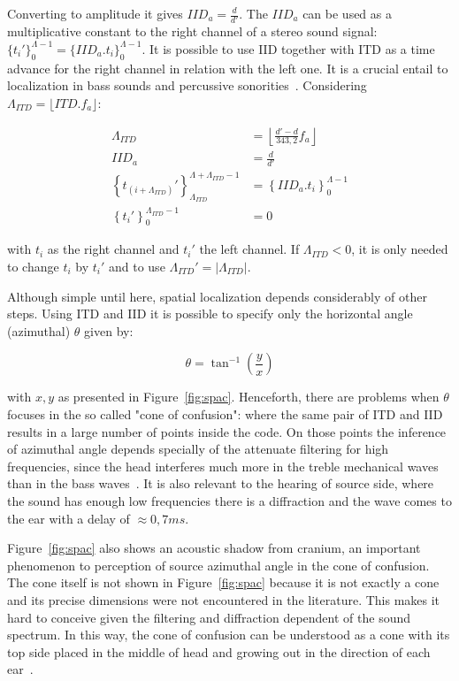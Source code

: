 \documentclass[
 aip,
 jmp,
 amsmath,amssymb,
 reprint,
]{revtex4-1}
\begin{document}
Converting to amplitude it gives $IID_a=\frac{d}{d'}$. The $IID_a$ can be used as a multiplicative constant to the right channel of a stereo sound signal: $\{t_i'\}_0^{\Lambda -1}=\{IID_a . t_i\}_0^{\Lambda -1}$. It is possible to use IID together with ITD as a time advance for the right channel in relation with the left one. It is a crucial entail to localization in bass sounds and percussive sonorities~\cite{Heeger}. 
Considering $\Lambda_{ITD}=\lfloor ITD . f_a \rfloor$:

\begin{equation}\label{eq:locImpl}
\begin{split}
\Lambda_{ITD} & = \left \lfloor \frac{d'-d}{343,2}  f_a \right \rfloor \\
IID_a & = \frac{d}{d'} \\
\left\{t_{(i+\Lambda_{ITD})}'\right\}_{\Lambda_{ITD}}^{\Lambda+\Lambda_{ITD}-1} & =\left\{IID_a . t_i\right\}_0^{\Lambda-1} \\
\left\{t_i'\right\}_0^{\Lambda_{ITD}-1} & = 0
\end{split}
\end{equation}

\noindent with $t_i$ as the right channel and $t_i'$ the left channel. If $\Lambda_{ITD} < 0 $, it is only needed to change $t_i$ by $t_i'$ and to use $\Lambda_{ITD}'= | \Lambda_{ITD} | $.

Although simple until here, spatial localization depends considerably of other steps. Using ITD and IID it is possible to specify only the horizontal angle (azimuthal) $\theta$ given by:

\begin{equation}\label{eq:angulo}
\theta=\tan^{-1}\left ( \frac{y}{ x }  \right )
\end{equation}

\noindent with $x,y$ as presented in Figure~\ref{fig:spac}. Henceforth, there are problems when $\theta$ focuses in the so called "cone of confusion": where the same pair of ITD and IID results in a large number of points inside the code. On those points the inference of azimuthal angle depends specially of the attenuate filtering for high frequencies, since the head interferes much more in the treble mechanical waves than in the bass waves~\cite{Heeger,hrtf}. It is also relevant to the hearing of source side, where the sound has enough low frequencies there is a diffraction and the wave comes to the ear with a delay of $\approx 0,7ms$.\cite{floEsp}

Figure~\ref{fig:spac} also shows an acoustic shadow from cranium, an important phenomenon to perception of source azimuthal angle in the cone of confusion. The cone itself is not shown in Figure~\ref{fig:spac} because it is not exactly a cone and its precise dimensions were not encountered in the literature. This makes it hard to conceive given the filtering and diffraction dependent of the sound spectrum. In this way, the cone of confusion can be understood as a cone with its top side placed in the middle of head and growing out in the direction of each ear~\cite{hrtf}.
\end{document}
